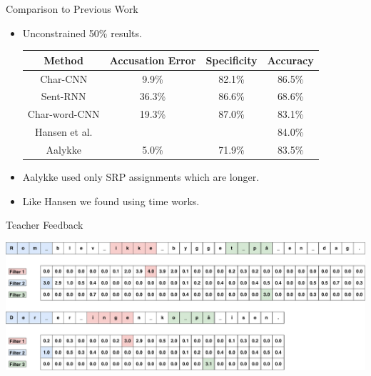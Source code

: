 \documentclass[10pt]{beamer}
\begin{document}
\begin{frame}[fragile]{Comparison to Previous Work}
    \begin{itemize}
        \item Unconstrained 50\% results.
            \begin{center}
                \begin{tabular}{c|ccc}
                    \textbf{Method}      & \textbf{Accusation Error} &
                    \textbf{Specificity} & \textbf{Accuracy}
                    \\ \hline
                    Char-CNN             & 9.9\%                     &
                    82.1\%               & 86.5\%
                    \\
                    Sent-RNN             & 36.3\%                    &
                    86.6\%               & 68.6\%
                    \\
                    Char-word-CNN        & 19.3\%                    &
                    87.0\%               & 83.1\%
                    \\
                    Hansen et al.        &                           &
                                         & 84.0\%
                    \\
                    Aalykke              & 5.0\%                     &
                    71.9\%               & 83.5\%
                    \\
                \end{tabular}
            \end{center}
        \item Aalykke used only SRP assignments which are longer.
        \item Like Hansen we found using time works.
    \end{itemize}
\end{frame}

\begin{frame}[fragile]{Teacher Feedback}
    \begin{center}
        \includegraphics[width=\textwidth]{../../report/pictures/discussion/teacher_feedback_example}
    \end{center}
\end{frame}
\end{document}
